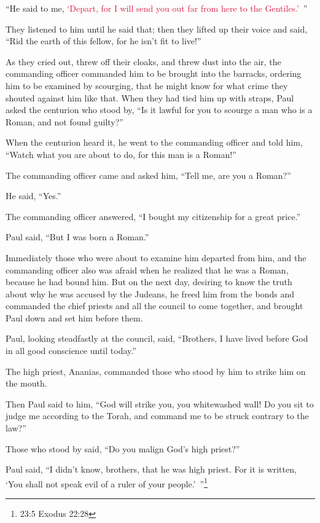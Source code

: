\myverse{}“He said to me,
\textcolor{crimson}{‘Depart, for I will send you out far from here to the Gentiles.’} ”

\myverse{}They listened to him until he said that; then they lifted up
their voice and said, “Rid the earth of this fellow, for he isn’t fit to live!”

\myverse{}As they cried out, threw off their cloaks, and threw dust into
the air,
\myverse{}the commanding officer commanded him to be brought into the barracks, ordering
him to be examined by scourging, that he might know for what crime they shouted against him like that.
\myverse{}When they had tied him up with straps, Paul asked the centurion who stood
by, “Is it lawful for you to scourge a man who is a Roman, and not found guilty?”

\myverse{}When the centurion heard it, he went to the commanding officer
and told him, “Watch what you are about to do, for this man is a Roman!”

\myverse{}The commanding officer came and asked him, “Tell me, are you
a Roman?”

He said, “Yes.”

\myverse{}The commanding officer answered, “I bought my citizenship for
a great price.”

Paul said, “But I was born a Roman.”

\myverse{}Immediately those who were about to examine him departed from
him, and the commanding officer also was afraid when he realized that he was a Roman, because he had bound
him.
\myverse{}But on the next day, desiring to know the truth about why he was accused by the Judeans,
he freed him from the bonds and commanded the chief priests and all the council to come together, and
brought Paul down and set him before them.


\mychapter{} \myverse*{}Paul, looking steadfastly at the council, said, “Brothers, I have
lived before God in all good conscience until today.”

\myverse{}The high priest, Ananias, commanded those who stood by him to
strike him on the mouth.

\myverse{}Then Paul said to him, “God will strike you, you whitewashed wall!
Do you sit to judge me according to the Torah, and command me to be struck contrary to the law?”

\myverse{}Those who stood by said, “Do you malign God’s high priest?”

\myverse{}Paul said, “I didn’t know, brothers, that he was high priest.
For it is written, ‘You shall not speak evil of a ruler of your people.’ ”\footnote{23:5 Exodus 22:28}

